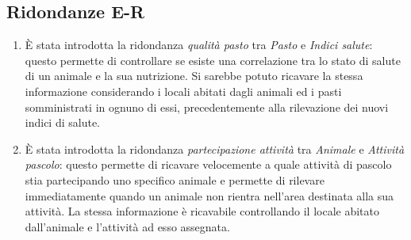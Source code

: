 \documentclass[12pt,a4paper]{article}
\begin{document}
\subsection{Ridondanze E-R}
\label{subsec:ridondanze-ent-rel}

\begin{enumerate}

\item \`E stata introdotta la ridondanza \textit{qualità pasto} tra \textit{Pasto} e \textit{Indici salute}: questo permette di controllare se esiste una correlazione tra lo stato di salute di un animale e la sua nutrizione. Si sarebbe potuto ricavare la stessa informazione considerando i locali abitati dagli animali ed i pasti somministrati in ognuno di essi, precedentemente alla rilevazione dei nuovi indici di salute.
\item \`E stata introdotta la ridondanza \textit{partecipazione attività} tra \textit{Animale} e \textit{Attività pascolo}: questo permette di ricavare velocemente a quale attività di pascolo stia partecipando uno specifico animale e permette di rilevare immediatamente quando un animale non rientra nell'area destinata alla sua attività. La stessa informazione è ricavabile controllando il locale abitato dall'animale e l'attività ad esso assegnata.

\end{enumerate}
\end{document}
